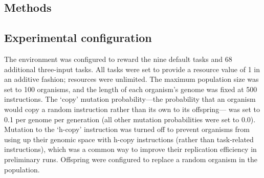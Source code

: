 \begin{doublespace}
%
%
%
%
%
%
%

\section{Methods}

\subsection{Experimental configuration}

The environment was configured to reward the nine default tasks
and 68 additional three-input tasks.
%
All tasks were set to provide a resource value of 1 in an additive fashion;
resources were unlimited.
%
The maximum population size was set to 100 organisms,
and the length of each organism's genome was fixed at 500 instructions.
%
The `copy' mutation probability---the probability that an organism
would copy a random instruction rather than its own to its offspring---%
was set to 0.1 per genome per generation
(all other mutation probabilities were set to 0.0).
%
Mutation to the `h-copy' instruction was turned off to prevent
organisms from using up their genomic space with h-copy instructions
(rather than task-related instructions), which was a common way
to improve their replication efficiency in preliminary runs.
%
Offspring were configured to replace a random organism in the population.




\end{doublespace}
